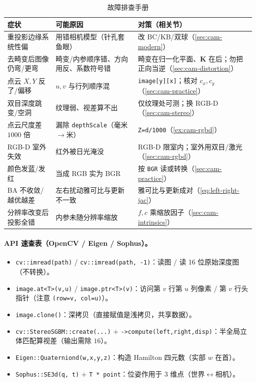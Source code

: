 \begin{table}[H]\centering\small
\caption{故障排查手册}
\begin{tabular}{lll}
\toprule
症状 & 可能原因 & 对策（相关节） \\
\midrule
重投影边缘系统性偏 & 用错相机模型（针孔套鱼眼） & 改 BC/KB/双球（\cref{sec:cam-modern}） \\
去畸变后图像仍弯/更弯 & 畸变/内参顺序错、方向用反、系数符号错 & 畸变在归一化平面、$\mathbf{K}$ 在后；勿把正向当逆（\cref{sec:cam-distortion}） \\
点云 $X,Y$ 反了/偏移 & $u,v$ 与行列顺序混 & \texttt{image[y][x]}；核对 $c_x,c_y$（\cref{sec:cam-practice}） \\
双目深度跳变/空洞 & 纹理弱、视差算不出 & 仅纹理处可测；换 RGB-D（\cref{sec:cam-stereo}） \\
点云尺度差 $1000$ 倍 & 漏除 \texttt{depthScale}（毫米$\to$米） & \texttt{Z=d/1000}（\cref{ex:cam-rgbd}） \\
RGB-D 室外失效 & 红外被日光淹没 & RGB-D 限室内；室外用双目/激光（\cref{sec:cam-rgbd}） \\
颜色发蓝/发红 & 当成 RGB 实为 BGR & 按 \texttt{BGR} 读或转换（\cref{sec:cam-practice}） \\
BA 不收敛/越优越差 & 左右扰动雅可比与更新不一致 & 雅可比与更新成对（\cref{eq:left-right-jac}） \\
分辨率改变后投影全错 & 内参未随分辨率缩放 & $f,c$ 乘缩放因子（\cref{sec:cam-intrinsics}） \\
\bottomrule
\end{tabular}
\end{table}

\paragraph{API 速查表（OpenCV / Eigen / Sophus）。}
\begin{itemize}
  \item \texttt{cv::imread(path)} / \texttt{cv::imread(path, -1)}：读图 / 读 16 位原始深度图（不转换）。
  \item \texttt{image.at<T>(v,u)} / \texttt{image.ptr<T>(v)}：访问第 $v$ 行第 $u$ 列像素 / 第 $v$ 行头指针（注意 \texttt{(row=v, col=u)}）。
  \item \texttt{image.clone()}：深拷贝（直接赋值是浅拷贝，共享数据）。
  \item \texttt{cv::StereoSGBM::create(...)} $+$ \texttt{->compute(left,right,disp)}：半全局立体匹配算视差（输出需除 $16$）。
  \item \texttt{Eigen::Quaterniond(w,x,y,z)}：构造 Hamilton 四元数（实部 $w$ 在首）。
  \item \texttt{Sophus::SE3d(q, t)} $+$ \texttt{T * point}：位姿作用于 3 维点（世界$\leftrightarrow$相机）。
\end{itemize}

